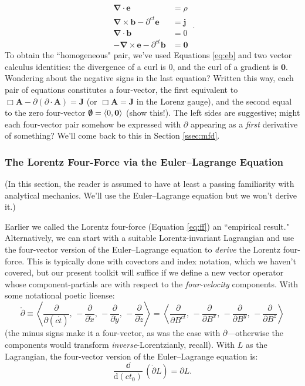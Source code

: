 \documentclass[12pt]{article}
\renewcommand{\vv}[1]{\mathbf{#1}}
\newcommand{\dd}[1]{\mathrm{d}#1}
\newcommand{\del}{\boldsymbol{\nabla}}
\begin{document}
\begin{equation}\label{eq:me}
\boxed{
\begin{aligned}
\del \cdot \vv e &= \rho \\
\del \times \vv b - \partial^{ct} \vv e &= \vv j \\ 
\del \cdot \vv b &= 0 \\
- \del \times \vv e - \partial^{ct} \vv b &= \vv 0
\end{aligned}
} \, .
\end{equation}
To obtain the ``homogeneous" pair, we've used Equations \ref{eq:eb} and two vector calculus identities: the divergence of a curl is $0$, and the curl of a gradient is $\vv 0$. Wondering about the negative signs in the last equation? Written this way, each pair of equations constitutes a four-vector, the first equivalent to $\Box \vv A - \partialup ( \partialup \cdot \vv A) = \vv J$ (or $\Box \vv A = \vv J$ in the Lorenz gauge), and the second equal to the zero four-vector $\textrm{\mbox{\boldmath $\emptyset$}} = \langle 0, \vv 0 \rangle$ (show this!). The left sides are suggestive; might each four-vector pair somehow be expressed with $\partialup$ appearing as a \emph{first} derivative of something? We'll come back to this in Section \ref{ssec:mfd}.


\subsubsection{The Lorentz Four-Force via the Euler--Lagrange Equation}\label{sssec:ele}

(In this section, the reader is assumed to have at least a passing familiarity with analytical mechanics. We'll use the Euler--Lagrange equation but we won't derive it.)

Earlier we called the Lorentz four-force (Equation \ref{eq:ff}) an ``empirical result." Alternatively, we can start with a suitable Lorentz-invariant Lagrangian and use the four-vector version of the Euler--Lagrange equation to \emph{derive} the Lorentz four-force. This is typically done with covectors and index notation, which we haven't covered, but our present toolkit will suffice if we define a new vector operator whose component-partials are with respect to the \emph{four-velocity} components. With some notational poetic license:
\begin{equation*}
\mathring{\partialup} \equiv \left \langle \dfrac{\partial}{\partial (c \mathring{t})} , \,  - \dfrac{\partial}{\partial \mathring{x}} , \, - \dfrac{\partial}{\partial \mathring{y}} , \, - \dfrac{\partial}{\partial \mathring{z}} \right \rangle = \left \langle \dfrac{\partial}{\partial B^{ct}} , \,  - \dfrac{\partial}{\partial B^x} , \, - \dfrac{\partial}{\partial B^y} , \, - \dfrac{\partial}{\partial B^z} \right \rangle
\end{equation*}
(the minus signs make it a four-vector, as was the case with $\partialup$---otherwise the components would transform \emph{inverse}-Lorentzianly, recall). With $L$ as the Lagrangian, the four-vector version of the Euler--Lagrange equation is:
\begin{equation}\label{eq:ele}
\dfrac{\dd}{\dd (c t_0)} \, ( \mathring{\partialup} L ) = \partialup L .
\end{equation}
\end{document}
